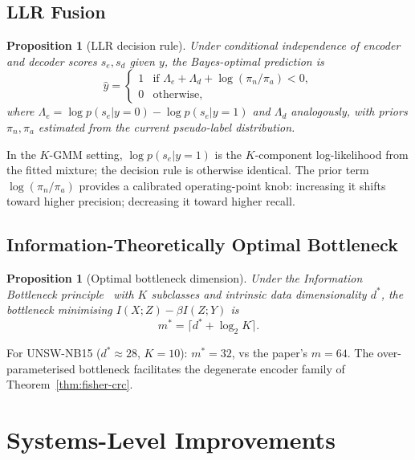 \documentclass[conference]{IEEEtran}
\newtheorem{proposition}[theorem]{Proposition}
\begin{document}
\subsection{LLR Fusion}

\begin{proposition}[LLR decision rule]\label{prop:llr}
Under conditional independence of encoder and decoder scores $s_e, s_d$
given $y$, the Bayes-optimal prediction is
\begin{equation}
\hat y =
\begin{cases}
1 & \text{if } \Lambda_e + \Lambda_d + \log(\pi_n/\pi_a) < 0,\\
0 & \text{otherwise},
\end{cases}
\label{eq:llr}
\end{equation}
where $\Lambda_e = \log p(s_e | y\!=\!0) - \log p(s_e | y\!=\!1)$
and $\Lambda_d$ analogously, with priors $\pi_n, \pi_a$ estimated from
the current pseudo-label distribution.
\end{proposition}

In the $K$-GMM setting, $\log p(s_e|y\!=\!1)$ is the $K$-component
log-likelihood from the fitted mixture; the decision rule is otherwise
identical. The prior term $\log(\pi_n/\pi_a)$ provides a calibrated
operating-point knob: increasing it shifts toward higher precision;
decreasing it toward higher recall.

\subsection{Information-Theoretically Optimal Bottleneck}

\begin{proposition}[Optimal bottleneck dimension]\label{prop:bottleneck}
Under the Information Bottleneck principle~\cite{tishby2000information}
with $K$ subclasses and intrinsic data dimensionality $d^*$, the
bottleneck minimising $I(X;Z) - \beta I(Z;Y)$ is
\begin{equation}
m^* = \lceil d^* + \log_2 K \rceil.
\label{eq:bottleneck}
\end{equation}
\end{proposition}

For UNSW-NB15 ($d^* \approx 28$, $K=10$): $m^* = 32$, vs the paper's $m=64$.
The over-parameterised bottleneck facilitates the degenerate encoder family
of Theorem~\ref{thm:fisher-crc}.

\section{Systems-Level Improvements}\label{sec:systems}
\end{document}
